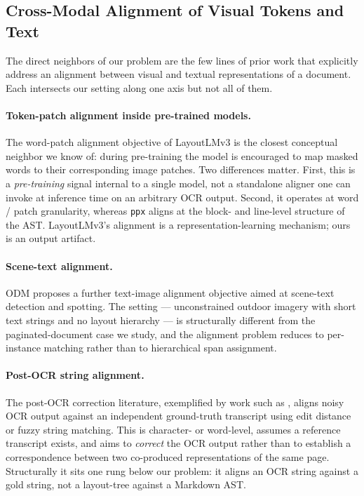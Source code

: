 \documentclass{article}
\theoremstyle{definition}
\begin{document}
\subsection{Cross-Modal Alignment of Visual Tokens and Text}

The direct neighbors of our problem are the few lines of prior
work that explicitly address an alignment between visual and textual
representations of a document.  Each intersects our setting along
one axis but not all of them.

\paragraph{Token-patch alignment inside pre-trained models.}  The
word-patch alignment objective of LayoutLMv3
\cite{huang2022layoutlmv3} is the closest conceptual neighbor we
know of: during pre-training the model is encouraged to map masked
words to their corresponding image patches.  Two differences matter.
First, this is a \emph{pre-training} signal internal to a single
model, not a standalone aligner one can invoke at inference time on
an arbitrary OCR output.  Second, it operates at word / patch
granularity, whereas \texttt{ppx} aligns at the block- and
line-level structure of the AST.  LayoutLMv3's alignment is a
representation-learning mechanism; ours is an output artifact.

\paragraph{Scene-text alignment.}  ODM \cite{duan2024odm} proposes
a further text-image alignment objective aimed at scene-text
detection and spotting.  The setting --- unconstrained outdoor
imagery with short text strings and no layout hierarchy --- is
structurally different from the paginated-document case we study,
and the alignment problem reduces to per-instance matching rather
than to hierarchical span assignment.

\paragraph{Post-OCR string alignment.}  The post-OCR correction
literature, exemplified by work such as
\cite{martinek2019aligning}, aligns noisy OCR output against an
independent ground-truth transcript using edit distance or fuzzy
string matching.  This is character- or word-level, assumes a
reference transcript exists, and aims to \emph{correct} the OCR
output rather than to establish a correspondence between two
co-produced representations of the same page.  Structurally it sits
one rung below our problem: it aligns an OCR string against a gold
string, not a layout-tree against a Markdown AST.
\end{document}
